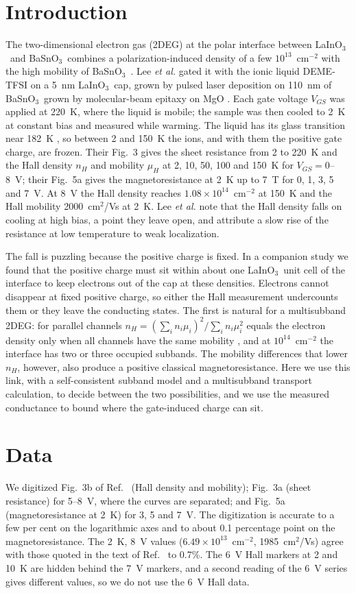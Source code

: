 \documentclass[11pt]{article}
\newcommand{\LIO}{\texorpdfstring{LaInO$_3$}{LaInO3}}
\newcommand{\BSO}{\texorpdfstring{BaSnO$_3$}{BaSnO3}}
\begin{document}
\section{Introduction}
The two-dimensional electron gas (2DEG) at the polar interface between \LIO\ and \BSO\ combines a polarization-induced density of a few $10^{13}$~cm$^{-2}$ with the high mobility of \BSO\ \cite{Kim2016LIO,Kim2019LIO,Aggoune2021}. Lee \emph{et al.} gated it with the ionic liquid DEME-TFSI on a 5~nm \LIO\ cap, grown by pulsed laser deposition on 110~nm of \BSO\ grown by molecular-beam epitaxy on MgO \cite{Lee2024LIO}. Each gate voltage $V_{GS}$ was applied at 220~K, where the liquid is mobile; the sample was then cooled to 2~K at constant bias and measured while warming. The liquid has its glass transition near 182~K \cite{McCann2015}, so between 2 and 150~K the ions, and with them the positive gate charge, are frozen. Their Fig.~3 gives the sheet resistance from 2 to 220~K and the Hall density $n_H$ and mobility $\mu_H$ at 2, 10, 50, 100 and 150~K for $V_{GS}=0$--8~V; their Fig.~5a gives the magnetoresistance at 2~K up to 7~T for 0, 1, 3, 5 and 7~V. At 8~V the Hall density reaches $1.08\times10^{14}$~cm$^{-2}$ at 150~K and the Hall mobility 2000~cm$^2$/Vs at 2~K. Lee \emph{et al.} note that the Hall density falls on cooling at high bias, a point they leave open, and attribute a slow rise of the resistance at low temperature to weak localization.

The fall is puzzling because the positive charge is fixed. In a companion study \cite{OwnbyMAT02} we found that the positive charge must sit within about one \LIO\ unit cell of the interface to keep electrons out of the cap at these densities. Electrons cannot disappear at fixed positive charge, so either the Hall measurement undercounts them or they leave the conducting states. The first is natural for a multisubband 2DEG: for parallel channels $n_H=(\sum_in_i\mu_i)^2/\sum_in_i\mu_i^2$ equals the electron density only when all channels have the same mobility \cite{Ziman1972}, and at $10^{14}$~cm$^{-2}$ the interface has two or three occupied subbands. The mobility differences that lower $n_H$, however, also produce a positive classical magnetoresistance. Here we use this link, with a self-consistent subband model and a multisubband transport calculation, to decide between the two possibilities, and we use the measured conductance to bound where the gate-induced charge can sit.

\section{Data}\label{sec:data}
We digitized Fig.~3b of Ref.~\cite{Lee2024LIO} (Hall density and mobility); Fig.~3a (sheet resistance) for 5--8~V, where the curves are separated; and Fig.~5a (magnetoresistance at 2~K) for 3, 5 and 7~V. The digitization is accurate to a few per cent on the logarithmic axes and to about 0.1 percentage point on the magnetoresistance. The 2~K, 8~V values ($6.49\times10^{13}$~cm$^{-2}$, 1985~cm$^2$/Vs) agree with those quoted in the text of Ref.~\cite{Lee2024LIO} to 0.7\%. The 6~V Hall markers at 2 and 10~K are hidden behind the 7~V markers, and a second reading of the 6~V series gives different values, so we do not use the 6~V Hall data.
\end{document}
